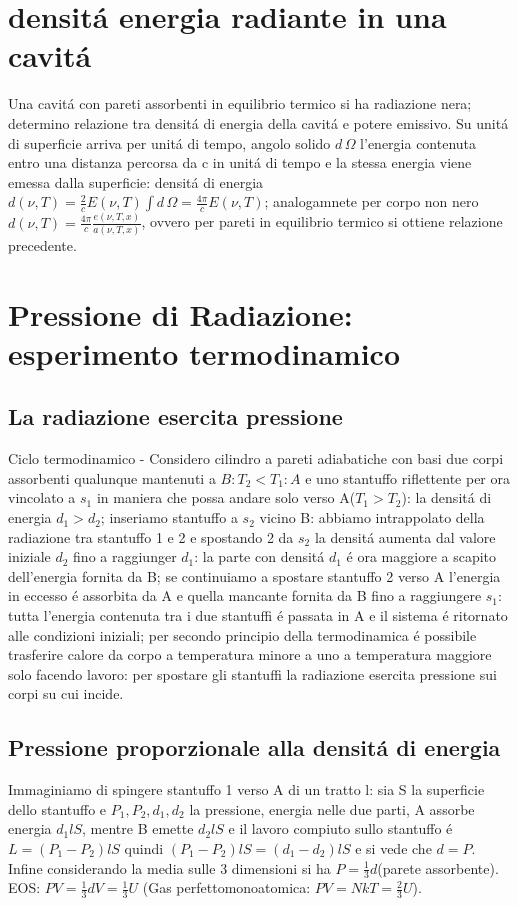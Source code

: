             \section{densit\'a energia radiante in una cavit\'a}
            Una cavit\'a con pareti assorbenti in equilibrio termico si ha radiazione nera; determino relazione tra densit\'a di energia della cavit\'a e potere emissivo. Su unit\'a di superficie arriva per unit\'a di tempo, angolo solido $d\,\Omega$ l'energia contenuta entro una distanza percorsa da c in unit\'a di tempo e la stessa energia viene emessa dalla superficie: densit\'a di energia $d(\nu,T)=\frac{2}{c}E(\nu,T)\int d\,\Omega=\frac{4\pi}{c}E(\nu,T)$; analogamnete per corpo non nero $d(\nu,T)=\frac{4\pi}{c}\frac{e(\nu,T,x)}{a(\nu,T,x)}$, ovvero per pareti in equilibrio termico si ottiene relazione precedente.
        \section{Pressione di Radiazione: esperimento termodinamico}
            \subsection{La radiazione esercita pressione} 
                Ciclo termodinamico - Considero cilindro a  pareti adiabatiche con basi due corpi assorbenti qualunque mantenuti a $B:T_2<T_1:A$ e uno stantuffo riflettente per ora vincolato a $s_1$ in maniera che possa andare solo verso A($T_1>T_2$): la densit\'a di energia $d_1>d_2$; inseriamo stantuffo a $s_2$ vicino B: abbiamo intrappolato della radiazione tra stantuffo 1 e 2 e spostando 2 da $s_2$ la densit\'a aumenta dal valore iniziale $d_2$ fino a raggiunger $d_1$: la parte con densit\'a $d_1$ \'e ora maggiore a scapito dell'energia fornita da B; se continuiamo a spostare stantuffo 2 verso A l'energia in eccesso \'e assorbita da A e quella mancante fornita da B fino a raggiungere $s_1$: tutta l'energia contenuta tra i due stantuffi \'e passata in A e il sistema \'e ritornato alle condizioni iniziali; per secondo principio della termodinamica \'e possibile trasferire calore da corpo a temperatura minore a uno a temperatura maggiore solo facendo lavoro: per spostare gli stantuffi la radiazione esercita pressione sui corpi su cui incide.
            \subsection{Pressione proporzionale alla densit\'a di energia}
                Immaginiamo di spingere stantuffo 1 verso  A di un tratto l: sia S la superficie dello stantuffo e $P_1,P_2,d_1,d_2$ la pressione, energia nelle due parti, A assorbe energia $d_1lS$, mentre B emette $d_2lS$ e il lavoro compiuto sullo stantuffo \'e $L=(P_1-P_2)lS$ quindi $(P_1-P_2)lS=(d_1-d_2)lS$ e si vede che $d=P$.
                Infine considerando la media sulle 3 dimensioni si ha $P=\frac{1}{3}d$(parete assorbente). EOS: $PV=\frac{1}{3}dV=\frac{1}{3}U$ (Gas perfettomonoatomica: $PV=NkT=\frac{2}{3}U$).
